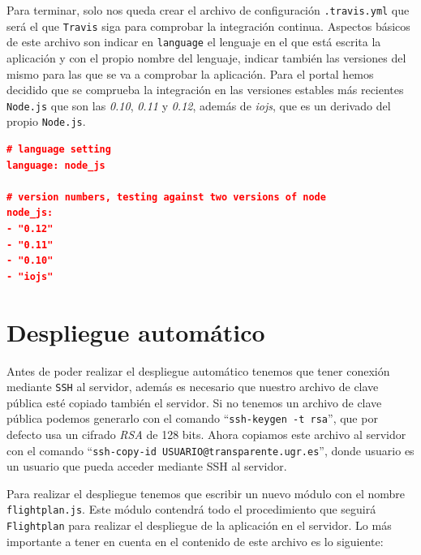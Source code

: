 Para terminar, solo nos queda crear el archivo de configuración {\tt .travis.yml} que será el que {\tt Travis} siga para comprobar la integración continua. Aspectos básicos de este archivo son indicar en {\tt language} el lenguaje en el que está escrita la aplicación y con el propio nombre del lenguaje, indicar también las versiones del mismo para las que se va a comprobar la aplicación. Para el portal hemos decidido que se comprueba la integración en las versiones estables más recientes {\tt Node.js} que son las \textit{0.10}, \textit{0.11} y \textit{0.12}, además de \textit{iojs}, que es un derivado del propio {\tt Node.js}.

\begin{lstlisting}[language=json,caption={Archivo JSON con informacion de personal},label={lst:json_personal}]
# language setting
language: node_js

# version numbers, testing against two versions of node
node_js:
- "0.12"
- "0.11"
- "0.10"
- "iojs"
\end{lstlisting}

\section{Despliegue automático}

Antes de poder realizar el despliegue automático tenemos que tener conexión mediante {\tt SSH} al servidor, además es necesario que nuestro archivo de clave pública esté copiado también el servidor. Si no tenemos un archivo de clave pública podemos generarlo con el comando ``{\tt ssh-keygen -t rsa}'', que por defecto usa un cifrado \textit{RSA} de 128 bits. Ahora copiamos este archivo al servidor con el comando ``{\tt ssh-copy-id USUARIO@transparente.ugr.es}'', donde usuario es un usuario que pueda acceder mediante SSH al servidor.

\bigskip

Para realizar el despliegue tenemos que escribir un nuevo módulo con el nombre {\tt flightplan.js}. Este módulo contendrá todo el procedimiento que seguirá {\tt Flightplan} para realizar el despliegue de la aplicación en el servidor. Lo más importante a tener en cuenta en el contenido de este archivo es lo siguiente:

